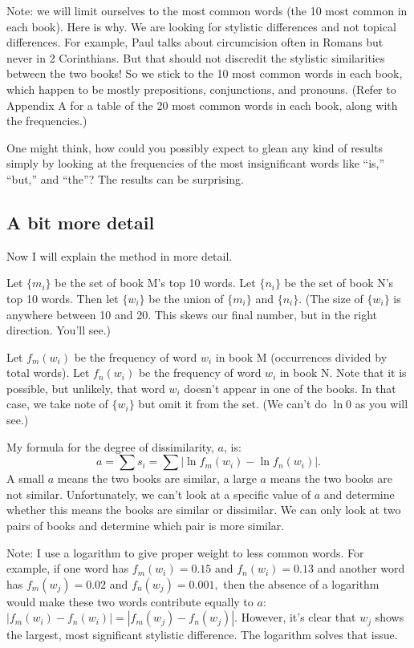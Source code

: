 \documentclass[12pt,letterpaper]{article}
\begin{document}
Note: we will limit ourselves to the most common words (the 10 most common in each book).  Here is why.  We are looking for stylistic differences and not topical differences.  For example, Paul talks about circumcision often in Romans but never in 2 Corinthians.  But that should not discredit the stylistic similarities between the two books!  So we stick to the 10 most common words in each book, which happen to be mostly prepositions, conjunctions, and pronouns.  (Refer to Appendix A for a table of the 20 most common words in each book, along with the frequencies.)

One might think, how could you possibly expect to glean any kind of results simply by looking at the frequencies of the most insignificant words like ``is,'' ``but,'' and ``the''?  The results can be surprising.

\subsection{A bit more detail}

Now I will explain the method in more detail.

Let $\{m_i\}$ be the set of book M's top 10 words.  Let $\{n_i\}$ be the set of book N's top 10 words.  Then let $\{w_i\}$ be the union of $\{m_i\}$ and $\{n_i\}.$  (The size of $\{w_i\}$ is anywhere between 10 and 20.  This skews our final number, but in the right direction.  You'll see.)

Let $f_m(w_i)$ be the frequency of word $w_i$ in book M (occurrences divided by total words).  Let $f_n(w_i)$ be the frequency of word $w_i$ in book N.  Note that it is possible, but unlikely, that word $w_i$ doesn't appear in one of the books.  In that case, we take note of $\{w_i\}$ but omit it from the set.  (We can't do $\ln 0$ as you will see.)

My formula for the degree of dissimilarity, $a$, is:
\begin{equation*}
a = \sum s_i = \sum |\ln f_m(w_i) - \ln f_n(w_i)|.
\end{equation*}
A small $a$ means the two books are similar, a large $a$ means the two books are not similar.  Unfortunately, we can't look at a specific value of $a$ and determine whether this means the books are similar or dissimilar.  We can only look at two pairs of books and determine which pair is more similar.  

Note: I use a logarithm to give proper weight to less common words.  For example, if one word has $f_m(w_i) = 0.15$ and $f_n(w_i) = 0.13$ and another word has $f_m(w_{j}) = 0.02$ and $f_n(w_{j}) = 0.001,$ then the absence of a logarithm would make these two words contribute equally to $a$: $|f_m(w_i) - f_n(w_i)| = |f_m(w_j) - f_n(w_j)|.$  However, it's clear that $w_{j}$ shows the largest, most significant stylistic difference.  The logarithm solves that issue.
\end{document}

